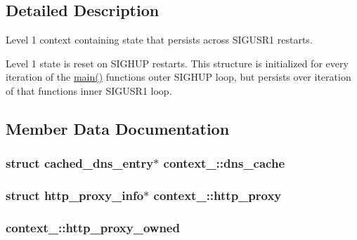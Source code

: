 \subsection{Detailed Description}
Level 1 context containing state that persists across {\ttfamily S\+I\+G\+U\+S\+R1} restarts.

Level 1 state is reset on {\ttfamily S\+I\+G\+H\+U\+P} restarts. This structure is initialized for every iteration of the {\ttfamily \hyperlink{openvpn_8c_a0ddf1224851353fc92bfbff6f499fa97}{main()}} function\textquotesingle{}s outer {\ttfamily S\+I\+G\+H\+U\+P} loop, but persists over iteration of that function\textquotesingle{}s inner {\ttfamily S\+I\+G\+U\+S\+R1} loop. 

\subsection{Member Data Documentation}
\hypertarget{structcontext__1_afa252fa776c920089066ddb7bdb16b24}{}
\subsubsection[{dns\+\_\+cache}]{\setlength{\rightskip}{0pt plus 5cm}struct {\bf cached\+\_\+dns\+\_\+entry}$\ast$ context\+\_\+::dns\+\_\+cache}\label{structcontext__1_afa252fa776c920089066ddb7bdb16b24}
\hypertarget{structcontext__1_aa41670c0d47426f2b7630ecde06d509e}{}
\subsubsection[{http\+\_\+proxy}]{\setlength{\rightskip}{0pt plus 5cm}struct {\bf http\+\_\+proxy\+\_\+info}$\ast$ context\+\_\+::http\+\_\+proxy}\label{structcontext__1_aa41670c0d47426f2b7630ecde06d509e}
\hypertarget{structcontext__1_a4df958b48a25d1ceec216de0287cc7dd}{}
\subsubsection[{http\+\_\+proxy\+\_\+owned}]{ context\+\_\+::http\+\_\+proxy\+\_\+owned}\label{structcontext__1_a4df958b48a25d1ceec216de0287cc7dd}
\hypertarget{structcontext__1_a2add75182e7da9d1d466d37c72e1c276}{}
